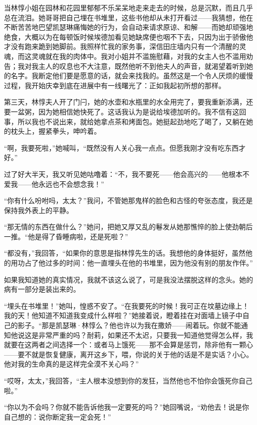 \par 当林惇小姐在园林和花园里郁郁不乐呆呆地走来走去的时候，总是沉默，而且几乎总在流泪。她哥哥把自己埋在书堆里，这些书他却从未打开看过——我猜想，他在不断苦苦地巴望凯瑟琳痛悔她的行为，会自动来请求原谅、和解——而她却顽强地绝食，大概以为在每顿饭时候埃德加看见她缺席便也咽不下去，只因为出于骄傲他才没有跑来跪到她脚前。我照样忙我的家务事，深信田庄墙内只有一个清醒的灵魂，而这灵魂就在我的肉体中。我对小姐并不滥施慰藉，对我的女主人也不滥用劝告；我对我主人的叹息也不大注意，既然他听不到他夫人的声音，就渴望着听到她的名字。我断定他们要是愿意的话，就会来找我的。虽然这是一个令人厌烦的缓慢过程，我开始庆幸到底在进展中有一线曙光了：正如我起初所想的那样。
\par 第三天，林惇夫人开了门闩，她的水壶和水瓶里的水全用完了，要我重新添满，还要一盆粥，因为她相信她快死了。这话我认为是说给埃德加听的。我不信有这回事，所以我也不说出来，就给她拿点茶和烤面包。她挺起劲地吃了喝了，又躺在她的枕头上，握紧拳头，呻吟着。
\par “啊，我要死啦，”她喊叫，“既然没有人关心我一点点。但愿我刚才没有吃东西才好。”
\par 过了好大半天，我又听见她咕噜着：“不，我不要死——他会高兴的——他根本不爱我——他永远也不会想念我！”
\par “你有什么吩咐吗，太太？”我问，不管她那鬼样的脸色和古怪的夸张态度，我还是保持我外表上的平静。
\par “那无情的东西在做什么？”她问，把她又厚又乱的鬈发从她那憔悴的脸上使劲朝后一推。“他是得了昏睡病啦，还是死啦？”
\par “都没有，”我回答，“如果你的意思是指林惇先生的话。我想他的身体挺好，虽然他的用功占了他过多的时间：他一直埋头在他的书堆里，因为他没有别的朋友作伴。”
\par 如果我知道她的真实情况，我就不该这么说了，可是我没法摆脱这样的念头。她的病有一部分是装出来的。
\par “埋头在书堆里！”她叫，惶惑不安了。“在我要死的时候！我可正在坟墓边缘上！我的天！他知道不知道我变成什么样啦？”她接着说，瞪着挂在对面墙上镜子中自己的影子。“那是凯瑟琳·林惇么？他也许以为我在撒娇——闹着玩。你就不能通知他说这是非常严重的吗？耐莉，如果还不太迟，只要我一知道他觉得怎么样，我就要在这两者之间选择一个：或者马上饿死——那不会算是惩罚，除非他有一颗心——要不就是恢复健康，离开这乡下，喂，你说的关于他的话是不是实话？小心。他对我的生命真的是这样完全漠不关心吗？”
\par “哎呀，太太，”我回答，“主人根本没想到你的发狂，当然他也不怕你会饿死你自己啦。”
\par “你以为不会吗？你就不能告诉他我一定要死的吗？”她回嘴说，“劝他去！说是你自己想的：说你断定我一定会死！”
